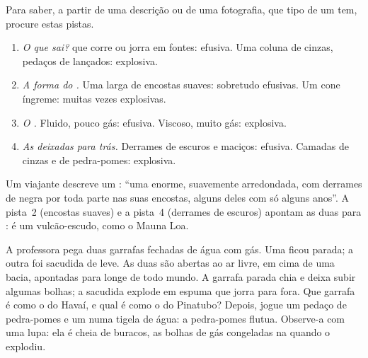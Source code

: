 \begin{method}\label{met:g7:volcanoes:clues}
Para saber, a partir de uma descrição ou de uma fotografia, que tipo de
 um  tem, procure estas pistas.
\begin{enumerate}
  \item \emph{O que sai?}  que corre ou jorra em fontes: efusiva. Uma
        coluna de cinzas, pedaços de  lançados: explosiva.
  \item \emph{A forma do .} Uma  larga de encostas suaves:
         sobretudo efusivas. Um cone íngreme: muitas vezes
        explosivas.
  \item \emph{O .} Fluido, pouco gás: efusiva. Viscoso, muito gás:
        explosiva.
  \item \emph{As  deixadas para trás.} Derrames de  escuros e
        maciços: efusiva. Camadas de cinzas e de pedra-pomes: explosiva.
\end{enumerate}
\end{method}

\begin{example}\label{ex:g7:volcanoes:clues}
Um viajante descreve um : ``uma  enorme, suavemente
arredondada, com derrames de  negra por toda parte nas suas encostas,
alguns deles com só alguns anos''. A pista~2 (encostas suaves) e a
pista~4 (derrames de  escuros) apontam as duas para :
é um vulcão-escudo, como o Mauna Loa.
\end{example}

\begin{inthelab}
A professora pega duas garrafas fechadas de água com gás. Uma ficou parada;
a outra foi sacudida de leve. As duas são abertas ao ar livre, em cima de
uma bacia, apontadas para longe de todo mundo. A garrafa parada chia e
deixa subir algumas bolhas; a sacudida explode em espuma que jorra para
fora. Que garrafa é como o  do Havaí, e qual é como o do Pinatubo?
Depois, jogue um pedaço de pedra-pomes e um  numa tigela de água: a
pedra-pomes flutua. Observe-a com uma lupa: ela é cheia de buracos, as
bolhas de gás congeladas na  quando o  explodiu.
\end{inthelab}

